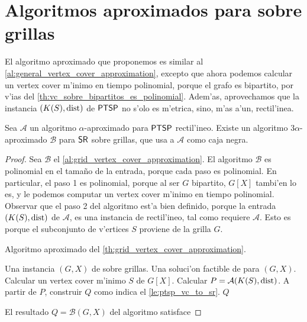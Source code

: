 \section{Algoritmos aproximados para  sobre grillas}

El algoritmo aproximado que proponemos es similar al \autoref{al:general_vertex_cover_approximation}, excepto que ahora podemos calcular un vertex cover m'inimo en tiempo polinomial, porque el grafo es bipartito, por v'ias del \autoref{th:vc_sobre_bipartitos_es_polinomial}. Adem'as, aprovechamos que la instancia $(K(S), \textnormal{dist})$ de $\textnormal{\textsf{PTSP}}$ no s'olo es m'etrica, sino, m'as a'un, rectil'inea. 

\begin{theorem}
\label{th:grid_vertex_cover_approximation}
Sea $\mathcal{A}$ un algoritmo $\alpha$-aproximado para $\textnormal{\textsf{PTSP}}$ rectil'ineo. Existe un algoritmo $3\alpha$-aproximado $\mathcal{B}$ para $\textnormal{\textsf{SR}}$ sobre grillas, que usa a $\mathcal{A}$ como caja negra.

\begin{proof}

Sea $\mathcal{B}$ el \autoref{al:grid_vertex_cover_approximation}. El algoritmo $\mathcal{B}$ es polinomial en el tama\~no de la entrada, porque cada paso es polinomial. En particular, el paso 1 es polinomial, porque al ser $G$ bipartito, $G[X]$ tambi'en lo es, y le podemos computar un vertex cover m'inimo en tiempo polinomial. Observar que el paso 2 del algoritmo est'a bien definido, porque la entrada $(K(S), \textnormal{dist})$ de $\mathcal{A}$, es una instancia de  rectil'ineo, tal como requiere $\mathcal{A}$. Esto es porque el subconjunto de v'ertices $S$ proviene de la grilla $G$.

\begin{algorithm}
  \caption{Algoritmo aproximado del \autoref{th:grid_vertex_cover_approximation}.}
  \label{al:grid_vertex_cover_approximation}
  \begin{algorithmic}[1]
  	\Require Una instancia $(G, X)$ de  sobre grillas.
  	\Ensure Una soluci'on factible de  para $(G, X)$.
  	\State Calcular un vertex cover m'inimo $S$ de $G[X]$.
	\State Calcular $P = \mathcal{A}(K(S), \textnormal{dist})$.
	\State A partir de $P$, construir $Q$ como indica el \autoref{le:ptsp_vc_to_sr}.
	\Return $Q$
  \end{algorithmic}
\end{algorithm}

El resultado $Q = \mathcal{B}(G, X)$ del algoritmo satisface


\end{proof}
\end{theorem}
